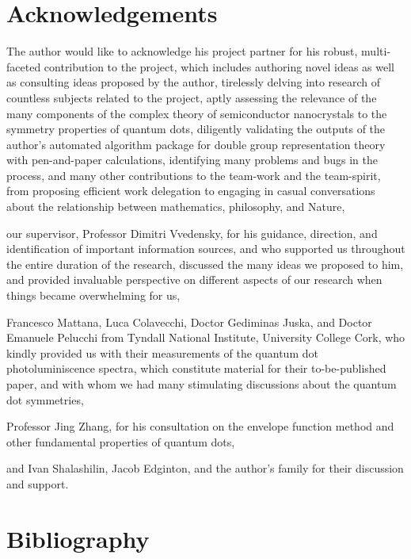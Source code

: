 \documentclass[12pt]{article}
\numberwithin{equation}{section}
\begin{document}
\section{Acknowledgements}
The author would like to acknowledge his project partner for his robust, multi-faceted contribution to the project, which includes authoring novel ideas as well as consulting ideas proposed by the author, tirelessly delving into research of countless subjects related to the project, aptly assessing the relevance of the many components of the complex theory of semiconductor nanocrystals to the symmetry properties of quantum dots, diligently validating the outputs of the author's automated algorithm package for double group representation theory with pen-and-paper calculations, identifying many problems and bugs in the process, and many other contributions to the team-work and the team-spirit, from proposing efficient work delegation to engaging in casual conversations about the relationship between mathematics, philosophy, and Nature,

our supervisor, Professor Dimitri Vvedensky, for his guidance, direction, and identification of important information sources, and who supported us throughout the entire duration of the research, discussed the many ideas we proposed to him, and provided invaluable perspective on different aspects of our research when things became overwhelming for us,

Francesco Mattana, Luca Colavecchi, Doctor Gediminas Juska, and Doctor Emanuele Pelucchi from Tyndall National Institute, University College Cork, who kindly provided us with their measurements of the quantum dot photoluminiscence spectra, which constitute material for their to-be-published paper, and with whom we had many stimulating discussions about the quantum dot symmetries,

Professor Jing Zhang, for his consultation on the envelope function method and other fundamental properties of quantum dots,

and Ivan Shalashilin, Jacob Edginton, and the author's family for their discussion and support.

\pagebreak

\section{Bibliography}
\renewcommand\refname{}

\begingroup
\let\clearpage\relax
\vspace{-1cm} %
\end{document}
